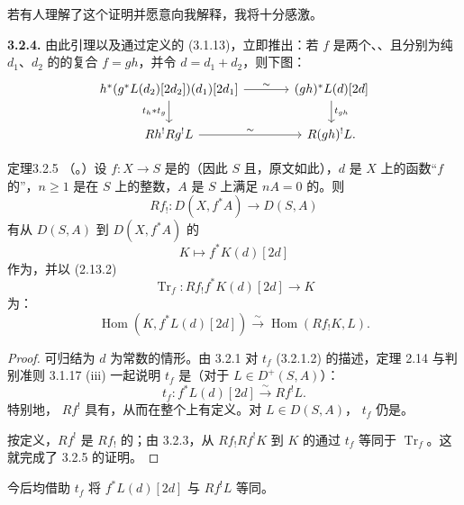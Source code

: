 若有人理解了这个证明并愿意向我解释，我将十分感激。

\textbf{3.2.4.} 由此引理以及通过定义的 (3.1.13)，立即推出：若 $f$ 是两个、、且分别为纯 $d_1$、$d_2$ 的的复合 $f=gh$，并令 $d=d_1+d_2$，则下图：
\[
\begin{tikzcd}[column sep=large]
h^*(g^*L(d_2)[2d_2])(d_1)[2d_1]\arrow[r,"\sim"]\arrow[d,"t_h\ast t_g"']
 &(gh)^*L(d)[2d]\arrow[d,"t_{gh}"]\\
Rh^!Rg^!L\arrow[r,"\sim"]&R(gh)^!L.
\end{tikzcd}
\]

\begin{SGAresult}{定理}{3.2.5}
（。）设 $f\colon X\to S$ 是的（因此 $S$ 且，原文如此），$d$ 是 $X$ 上的函数“$f$ 的”，$n\geq1$ 是在 $S$ 上的整数，$A$ 是 $S$ 上满足 $nA=0$ 的。则
\[
 Rf_!\colon D(X,f^*A)\longrightarrow D(S,A)
\]
有从 $D(S,A)$ 到 $D(X,f^*A)$ 的
\[
 K\longmapsto f^*K(d)[2d]
\]
作为，并以 (2.13.2)
\[
 \operatorname{Tr}_f\colon Rf_!f^*K(d)[2d]\longrightarrow K
\]
为：
\[
 \operatorname{Hom}(K,f^*L(d)[2d])\xrightarrow{\sim}\operatorname{Hom}(Rf_!K,L).
\]
\end{SGAresult}
\begin{proof}
可归结为 $d$ 为常数的情形。由 3.2.1 对 $t_f$ (3.2.1.2) 的描述，定理 2.14 与判别准则 3.1.17 (iii) 一起说明 $t_f$ 是（对于 $L\in D^+(S,A)$）：
\[
 t_f\colon f^*L(d)[2d]\xrightarrow{\sim}Rf^!L.
\]
特别地， $Rf^!$ 具有，从而在整个上有定义。对 $L\in D(S,A)$， $t_f$ 仍是。

按定义，$Rf^!$ 是 $Rf_!$ 的；由 3.2.3，从 $Rf_!Rf^!K$ 到 $K$ 的通过 $t_f$ 等同于 $\operatorname{Tr}_f$。这就完成了 3.2.5 的证明。
\end{proof}
今后均借助 $t_f$ 将 $f^*L(d)[2d]$ 与 $Rf^!L$ 等同。

